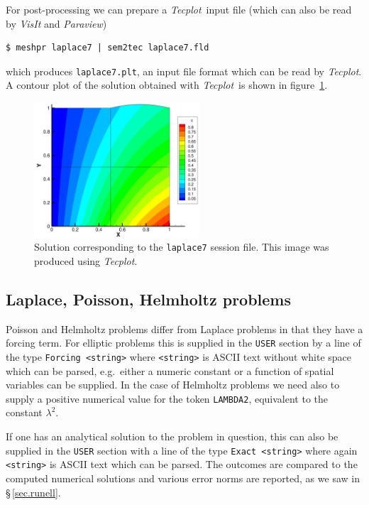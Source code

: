 \documentclass[11pt]{report}
\newcommand{\Tecplot}{\emph{Tecplot}}
\newcommand{\eg}{e.g.\ } \newcommand{\CC}{\mathrm{c.c.}}
\begin{document}
For post-processing we can prepare a \Tecplot\ input file (which can
also be read by \emph{VisIt} and \emph{Paraview})
%
{\small
\begin{verbatim}
$ meshpr laplace7 | sem2tec laplace7.fld
\end{verbatim}
}
%
\noindent
which produces \verb|laplace7.plt|, an input file format which can be
read by \Tecplot.  A contour plot of the solution obtained with
\Tecplot\ is shown in figure~\ref{fig.lapcont}.

\begin{figure}
\begin{center}
\includegraphics[width=0.55\textwidth]{laplace6cont}
\end{center}
\caption{ Solution corresponding to the \texttt{laplace7} session
  file.  This image was produced using \Tecplot.  }
\label{fig.lapcont}
\end{figure}

\subsection{Laplace, Poisson, Helmholtz problems}

Poisson and Helmholtz problems differ from Laplace problems in that
they have a forcing term.  For elliptic problems this is supplied in
the \verb|USER| section by a line of the type \verb|Forcing <string>|
where \verb|<string>| is ASCII text without white space which can be
parsed, \eg either a numeric constant or a function of spatial
variables can be supplied.  In the case of Helmholtz problems we need
also to supply a positive numerical value for the token
\verb|LAMBDA2|, equivalent to the constant $\lambda^2$.

If one has an analytical solution to the problem in question, this can
also be supplied in the \verb|USER| section with a line of the type
\verb|Exact <string>| where again \verb|<string>| is ASCII text which
can be parsed.  The outcomes are compared to the computed numerical
solutions and various error norms are reported, as we saw in
\S\,\ref{sec.runell}.
\end{document}
